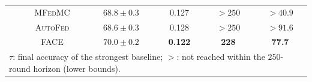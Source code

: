 \begin{table}[t]
\begin{tabular}{c|c|c|c|c|c}
        & \textsc{MFedMC}
        & $68.8 \pm 0.3$
        & 0.127
        & $>250$
        & $>40.9$ \\

        & \textsc{AutoFed}
        & $68.6 \pm 0.3$
        & 0.128
        & $>250$
        & $>91.6$ \\[1pt]

        & \textsc{FACE}
        & $\mathbf{70.0 \pm 0.2}$
        & \textbf{0.122}
        & \textbf{228}
        & \textbf{77.7} \\

        \bottomrule
        \multicolumn{6}{l}{
            \scriptsize $\tau$: final accuracy of the strongest baseline; $>$: not reached within the $250$-round horizon (lower bounds).
        }
    \end{tabular}
\end{table}
